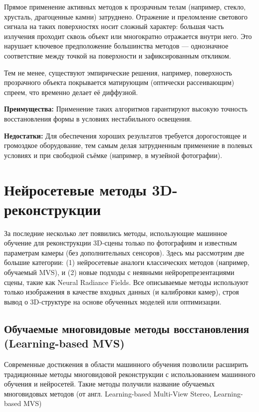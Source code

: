 Прямое применение активных методов к прозрачным телам (например, стекло,
хрусталь, драгоценные камни) затруднено. Отражение и преломление светового
сигнала на таких поверхностях носит сложный характер: большая часть излучения
проходит сквозь объект или многократно отражается внутри него. Это нарушает
ключевое предположение большинства методов — однозначное соответствие между
точкой на поверхности и зафиксированным откликом.

Тем не менее, существуют эмпирические решения, например, поверхность прозрачного
объекта покрывается матирующим (оптически рассеивающим) спреем, что временно делает
её диффузной.

\textbf{Преимущества:} Применение таких алгоритмов гарантируют высокую точность
восстановления формы в условиях нестабильного освещения.

\textbf{Недостатки:} Для обеспечения хороших результатов требуется дорогостоящее
и громоздкое оборудование, тем самым делая затрудненным применение в полевых
условиях и при свободной съёмке (например, в музейной фотографии).

\section{Нейросетевые методы 3D-реконструкции}

За последние несколько лет появились методы, использующие машинное обучение для
реконструкции 3D-сцены только по фотографиям и известным параметрам камеры (без
дополнительных сенсоров). Здесь мы рассмотрим две большие категории: (1)
нейросетевые аналоги классических методов (например, обучаемый MVS), и (2) новые
подходы с неявными нейрорепрезентациями сцены, такие как Neural Radiance
Fields. Все описываемые методы используют только изображения в качестве
входных данных (и калибровки камер), строя вывод о 3D-структуре на основе
обученных моделей или оптимизации.

\subsection{Обучаемые многовидовые методы восстановления (Learning-based MVS)}

Современные достижения в области машинного обучения позволили расширить
традиционные методы многовидовой реконструкции с использованием машинного
обучения и нейросетей. Такие методы получили название обучаемых многовидовых
методов (от англ. Learning-based Multi-View Stereo, Learning-based MVS)

